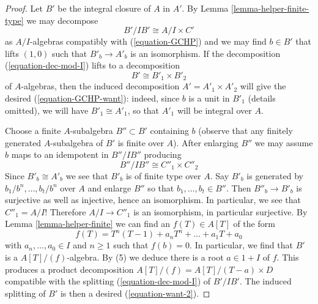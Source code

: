 \documentclass{amsart}
\theoremstyle{plain}
\theoremstyle{definition}
\theoremstyle{remark}
\numberwithin{equation}{subsection}
\begin{document}
\begin{proof}
\medskip\noindent
Let $B'$ be the integral closure of $A$ in $A'$. By
Lemma \ref{lemma-helper-finite-type}
we may decompose 
\begin{equation}
\label{equation-dec-mod-I}
B'/IB' \cong A/I \times C'
\end{equation}
as $A/I$-algebras compatibly with (\ref{equation-GCHP})
and we may find $b \in B'$ that lifts $(1, 0)$ such that
$B'_b \to A'_b$ is an isomorphism. If the decomposition
(\ref{equation-dec-mod-I}) lifts to a decomposition
\begin{equation}
\label{equation-want-2}
B' \cong B'_1 \times B'_2
\end{equation}
of $A$-algebras, then the induced decomposition
$A' = A'_1 \times A'_2$ will give the
desired (\ref{equation-GCHP-want}): indeed, since $b$ is a unit in $B'_1$
(details omitted),
we will have $B'_1 \cong A'_1$, so that $A'_1$ will be integral over $A$. 

\medskip\noindent
Choose a finite $A$-subalgebra $B'' \subset B'$ containing $b$
(observe that any finitely generated $A$-subalgebra of $B'$
is finite over $A$). After enlarging $B''$ we may assume
$b$ maps to an idempotent in $B''/IB''$ producing
\begin{equation}
\label{equation-again-dec-mod-I}
B''/IB'' \cong C''_1 \times C''_2
\end{equation}
Since $B'_b \cong A'_b$ we see that $B'_b$ is of finite type over $A$.
Say $B'_b$ is generated by $b_1/b^n, \ldots, b_t/b^n$ over $A$
and enlarge $B''$ so that $b_1, \ldots, b_t \in B''$. Then
$B''_b \to B'_b$ is surjective as well as injective, hence an isomorphism.
In particular, we see that $C''_1 = A/I$! Therefore $A/I \to C''_1$
is an isomorphism, in particular surjective.
By Lemma \ref{lemma-helper-finite} we can find
an $f(T) \in A[T]$ of the form
$$
f(T) = T^n(T - 1) + a_n T^n + \ldots + a_1 T + a_0
$$
with $a_n, \ldots, a_0 \in I$ and $n \ge 1$ such that $f(b) = 0$.
In particular, we find that $B'$ is a $A[T]/(f)$-algebra.
By (5) we deduce there is a root $a \in 1 + I$ of $f$.
This produces a product decomposition $A[T]/(f) = A[T]/(T - a) \times D$
compatible with the splitting (\ref{equation-dec-mod-I}) of $B'/IB'$.
The induced splitting of $B'$ is then a desired (\ref{equation-want-2}).
\end{proof}
\end{document}
